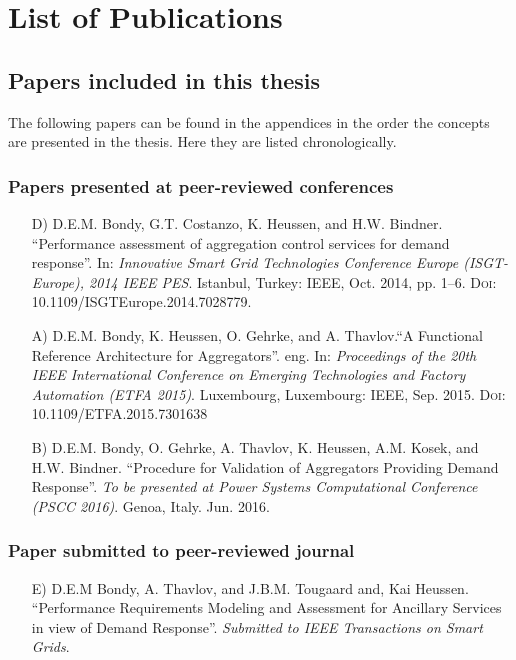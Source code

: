 \chapter{List of Publications}
\section*{Papers included in this thesis}
The following papers can be found in the appendices in the order the concepts are presented in the thesis. Here they are listed chronologically.
\subsection*{Papers presented at peer-reviewed conferences}
\begin{itemize}
	\item[D)] D.E.M. Bondy, G.T. Costanzo, K. Heussen, and H.W. Bindner. ``Performance assessment of aggregation control services for demand response''. In: \emph{Innovative Smart Grid Technologies Conference Europe (ISGT-Europe), 2014 IEEE PES}. Istanbul, Turkey: IEEE, Oct. 2014, pp. 1–6. \textsc{Doi}: 10.1109/ISGTEurope.2014.7028779.
	\item[A)] D.E.M. Bondy, K. Heussen, O. Gehrke, and A. Thavlov.``A Functional Reference Architecture for Aggregators''. eng. In: \emph{Proceedings of the 20th IEEE International Conference on Emerging Technologies and Factory Automation (ETFA 2015)}. Luxembourg, Luxembourg: IEEE, Sep. 2015. \textsc{Doi}: 10.1109/ETFA.2015.7301638
	\item[B)] D.E.M. Bondy, O. Gehrke, A. Thavlov, K. Heussen, A.M. Kosek, and H.W. Bindner. ``Procedure for Validation of Aggregators Providing Demand Response''. \emph{To be presented at Power Systems Computational Conference (PSCC 2016)}. Genoa, Italy. Jun. 2016.
\end{itemize}

\subsection*{Paper submitted to peer-reviewed journal}
\begin{itemize}
	\item[E)] D.E.M Bondy, A. Thavlov, and J.B.M. Tougaard and, Kai Heussen. ``Performance Requirements Modeling and Assessment for Ancillary Services in view of Demand Response''. \emph{Submitted to IEEE Transactions on Smart Grids}.
\end{itemize}


